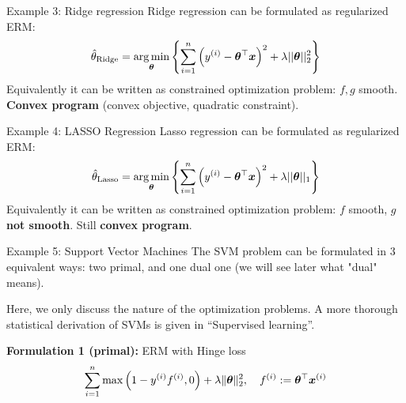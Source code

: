 \documentclass[11pt,compress,t,notes=noshow, xcolor=table]{beamer}
\begin{document}
\begin{framev}{Example 3: Ridge regression}
Ridge regression can be formulated as regularized ERM:
$$
\hat{\theta}_{\text{Ridge}} = \mathop{\mathrm{arg\,min}}_{\bm{\theta}} \left\{ \sum\limits_{i=1}^n \left(y^{(i)} - \bm{\theta}^\top\bm{x}\right)^2 + \lambda ||\bm{\theta}||_2^2 \right\}
$$
Equivalently it can be written as constrained optimization problem:
\spacer
$f, g$ smooth. \textbf{Convex program} (convex objective, quadratic constraint).
\end{framev}


\begin{framev}{Example 4: LASSO Regression}
Lasso regression can be formulated as regularized ERM:
$$
\hat{\theta}_{\text{Lasso}} =  \mathop{\mathrm{arg\,min}}_{\bm{\theta}} \left\{ \sum\limits_{i=1}^n \left(y^{(i)} - \bm{\theta}^\top\bm{x}\right)^2 + \lambda ||\bm{\theta}||_1 \right\}
$$
Equivalently it can be written as constrained optimization problem:
\spacer
$f$ smooth, $g$ \textbf{not smooth}. Still \textbf{convex program}.
\end{framev}


\begin{framev}{Example 5: Support Vector Machines}
The SVM problem can be formulated in $3$ equivalent ways: two primal, and one dual one (we will see later what "dual" means).
\begin{footnotesize}
Here, we only discuss the nature of the optimization problems. A more thorough statistical derivation of SVMs is given in ``Supervised learning''.\\
\end{footnotesize}
\spacer
\textbf{Formulation 1 (primal): } ERM with Hinge loss
$$
\sum\limits_{i=1}^n \max\left(1 - y^{(i)} f^{(i)}, 0\right) + \lambda \|\bm{\theta}\|_2^2, \quad f^{(i)} := \bm{\theta}^\top \bm{x}^{(i)}
$$
\end{framev}
\end{document}
